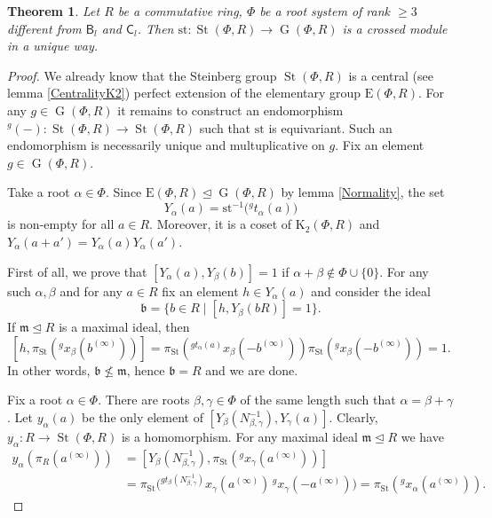 \documentclass{article}
\numberwithin{equation}{section}
\newtheorem{theorem}{Theorem}
\theoremstyle{definition}
\theoremstyle{remark}
\DeclareMathOperator\St{St}
\DeclareMathOperator\GG{G}
\newcommand{\up}[2]{{^{#1}\!{#2}}}
\newcommand{\rB}{\mathsf{B}}
\newcommand{\rC}{\mathsf{C}}
\begin{document}
\begin{theorem}\label{SteinbergCrossedModule}
 Let \(R\) be a commutative ring, \(\Phi\) be a root system of rank \(\geq 3\) different from \(\rB_l\) and \(\rC_l\). Then \(\mathrm{st} \colon \St(\Phi, R) \to \GG(\Phi, R)\) is a crossed module in a unique way.
\end{theorem}
\begin{proof}
 We already know that the Steinberg group \(\St(\Phi, R)\) is a central (see lemma \ref{CentralityK2}) perfect extension of the elementary group \(\mathrm E(\Phi, R)\). For any \(g \in \GG(\Phi, R)\) it remains to construct an endomorphism \(\up g{(-)} \colon \St(\Phi, R) \to \St(\Phi, R)\) such that \(\mathrm{st}\) is equivariant. Such an endomorphism is necessarily unique and multuplicative on \(g\). Fix an element \(g \in \GG(\Phi, R)\).

 Take a root \(\alpha \in \Phi\). Since \(\mathrm E(\Phi, R) \trianglelefteq \GG(\Phi, R)\) by lemma \ref{Normality}, the set
 \[Y_\alpha(a) = \mathrm{st}^{-1}\bigl(\up g{t_\alpha(a)}\bigr)\]
 is non-empty for all \(a \in R\). Moreover, it is a coset of \(\mathrm K_2(\Phi, R)\) and \(Y_\alpha(a + a') = Y_\alpha(a) Y_\alpha(a')\).

 First of all, we prove that \([Y_\alpha(a), Y_\beta(b)] = 1\) if \(\alpha + \beta \notin \Phi \cup \{0\}\). For any such \(\alpha, \beta\) and for any \(a \in R\) fix an element \(h \in Y_\alpha(a)\) and consider the ideal
 \[\mathfrak b = \{b \in R \mid [h, Y_\beta(bR)] = 1\}.\]
 If \(\mathfrak m \trianglelefteq R\) is a maximal ideal, then
 \[[h, \pi_{\St}(\up g {x_\beta(b^{(\infty)})})] = \pi_{\St}(\up{g t_\alpha(a)} {x_\beta(-b^{(\infty)})}) \pi_{\St}(\up g {x_\beta(-b^{(\infty)})}) = 1.\]
 In other words, \(\mathfrak b \not \leq \mathfrak m\), hence \(\mathfrak b = R\) and we are done.

 Fix a root \(\alpha \in \Phi\). There are roots \(\beta, \gamma \in \Phi\) of the same length such that \(\alpha = \beta + \gamma\). Let \(y_\alpha(a)\) be the only element of \([Y_\beta(N_{\beta, \gamma}^{-1}), Y_\gamma(a)]\). Clearly, \(y_\alpha \colon R \to \St(\Phi, R)\) is a homomorphism. For any maximal ideal \(\mathfrak m \trianglelefteq R\) we have
 \begin{align*}
  y_\alpha(\pi_R(a^{(\infty)}))
  &= [Y_\beta(N_{\beta, \gamma}^{-1}), \pi_{\St}(\up g{x_\gamma(a^{(\infty)})})]\\
  &= \pi_{\St}\bigl(\up{g t_\beta(N_{\beta, \gamma}^{-1})}{x_\gamma(a^{(\infty)})}\, \up g{x_\gamma(-a^{(\infty)})}\bigr) = \pi_{\St}(\up g{x_\alpha(a^{(\infty)})}).
 \end{align*}


\end{proof}
\end{document}
